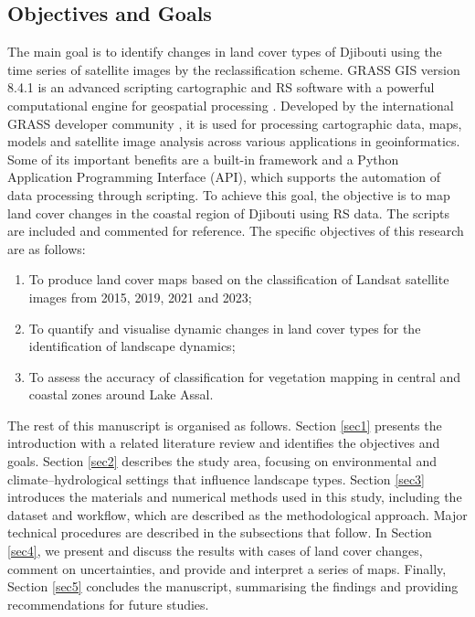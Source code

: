 \documentclass[jimaging,article,accept,pdftex,moreauthors]{Definitions/mdpi}
\begin{document}
\subsection{Objectives and Goals}

The main goal{ }is to{ identify}{ changes in land cover types }of Djibouti using the {time series of }satellite images {by the reclassification scheme}. {GRASS GIS version 8.4.1 %
is an advanced scripting cartographic and RS software with} a powerful computational engine for geospatial processing \cite{NETELER2012124}. {Developed by the international GRASS developer community} \cite{grass_development_team_2025_14918754}, {it is used for processing cartographic data, maps, models and satellite image analysis across various applications in geoinformatics. Some of its important benefits are a built-in framework and a Python Application Programming Interface (API), which supports the automation of data processing through scripting.} To achieve this goal, the objective{ }is to map land cover changes in the coastal region of Djibouti{ }using RS data.{ }The{ }scripts are included and commented for{ }reference{. }The specific objectives of this research are as follows:

\begin{enumerate}[leftmargin=2.1em,labelsep=0.3mm]
	\item To produce land cover maps based on{ }the classification of Landsat satellite images {from} {2015}, 2019, 2021 and 2023; 
	\item To quantify and visualise dynamic changes in land cover types {for the identification of landscape dynamics}; 
	\item To assess the accuracy of{ }classification for vegetation mapping in{ }central and coastal zones {around} Lake Assal. 
\end{enumerate}

{The rest of this manuscript is organised as follows. Section \ref{sec1} presents the introduction with a related literature review and identifies the objectives and goals. {Section \ref{sec2} describes the study area, focusing on environmental and climate--hydrological settings that {influence} landscape types.} %
Section \ref{sec3} introduces the materials and numerical methods used in this study, {including the dataset and workflow, which are described as the methodological approach.} %
Major technical procedures are described in the subsections that follow. In Section \ref{sec4}, we present and discuss the results with cases of land cover changes, comment on uncertainties, and provide and interpret a series of maps. Finally, Section \ref{sec5} concludes the manuscript, summarising the findings and providing recommendations for future studies.}
\end{document}
